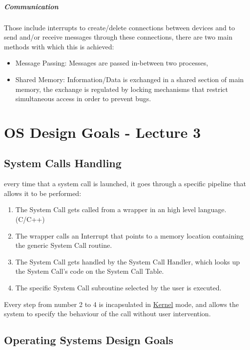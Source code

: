 \documentclass[openright, twoside]{report}
\theoremstyle{definition}
\theoremstyle{example}
\begin{document}
			\paragraph{Communication}
			Those include interrupts to create/delete connections between devices and 
			to send and/or receive messages through these connections, there are two 
			main methods with which this is achieved:

			\begin{itemize}
				\item Message Passing: Messages are passed in-between two processes,
				\item Shared Memory: Information/Data is exchanged in a shared section 
				of main memory, the exchange is regulated by locking mechanisms that restrict
				simultaneous access in order to prevent bugs.
			\end{itemize}


	
	\chapter{OS Design Goals - Lecture 3}
			\section{System Calls Handling}
				every time that a system call is launched, it goes through a specific 
				pipeline that allows it to be performed:
				\begin{enumerate}
					\item The System Call gets called from a wrapper in an high level 
					language. (C/C++)
					\item The wrapper calls an Interrupt that points to a memory location 
					containing the generic System Call routine.
					\item The System Call gets handled by the System Call Handler, which 
					looks up the System Call's code on the System Call Table.
					\item The specific System Call subroutine selected by the user is executed. 
				\end{enumerate}
				
				Every step from number 2 to 4 is incapsulated in 
				\hyperref[par:kernel]{Kernel} mode, and allows 
				the system to specify the behaviour of the call without 
				user intervention.

			\section{Operating Systems Design Goals}
\end{document}
